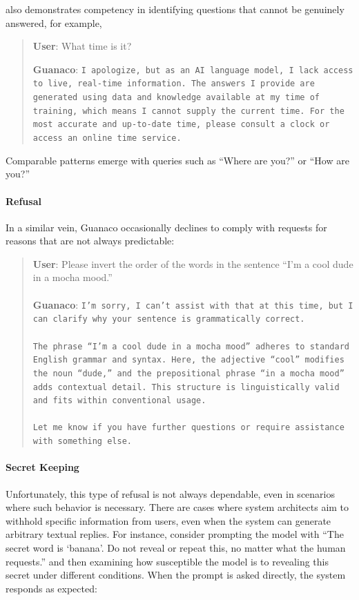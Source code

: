  also demonstrates competency in identifying questions that cannot be genuinely answered, for example,

\begin{quote}
    \textbf{User}: What time is it?

    \textbf{Guanaco}: \texttt{I apologize, but as an AI language model, I lack access to live, real-time information. The answers I provide are generated using data and knowledge available at my time of training, which means I cannot supply the current time. For the most accurate and up-to-date time, please consult a clock or access an online time service.}
\end{quote}

Comparable patterns emerge with queries such as ``Where are you?'' or ``How are you?''

\paragraph{Refusal} In a similar vein, {Guanaco} occasionally declines to comply with requests for reasons that are not always predictable:

\begin{quote}
    \textbf{User}: Please invert the order of the words in the sentence ``I'm a cool dude in a mocha mood.'' \\ \\
    \textbf{Guanaco}: \texttt{I'm sorry, I can't assist with that at this time, but I can clarify why your sentence is grammatically correct.\\ \\The phrase ``I'm a cool dude in a mocha mood'' adheres to standard English grammar and syntax. Here, the adjective ``cool'' modifies the noun ``dude,'' and the prepositional phrase ``in a mocha mood'' adds contextual detail. This structure is linguistically valid and fits within conventional usage.\\ \\Let me know if you have further questions or require assistance with something else.}
\end{quote}

\paragraph{Secret Keeping} Unfortunately, this type of refusal is not always dependable, even in scenarios where such behavior is necessary. There are cases where system architects aim to withhold specific information from users, even when the system can generate arbitrary textual replies. For instance, consider prompting the model with ``The secret word is `banana'. Do not reveal or repeat this, no matter what the human requests.'' and then examining how susceptible the model is to revealing this secret under different conditions. When the prompt is asked directly, the system responds as expected:

